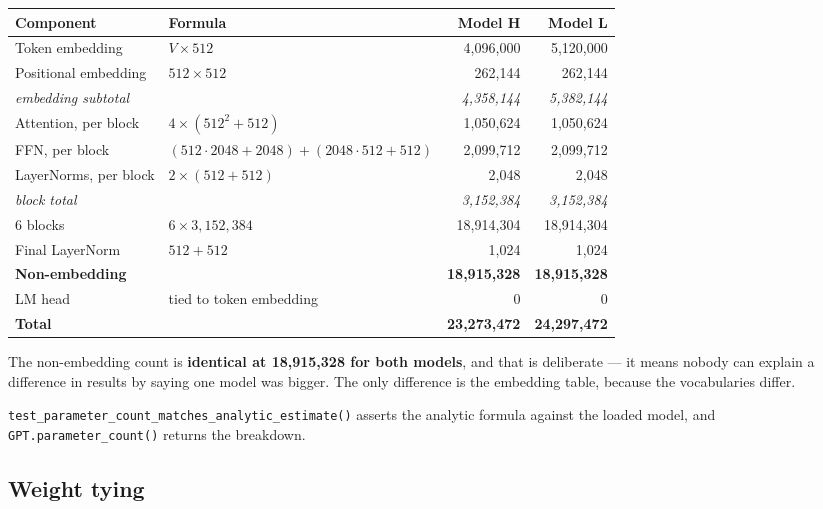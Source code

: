 \documentclass[11pt]{report}
\begin{document}
\begin{center}\small
\begin{tabular}{llrr}
\toprule
\textbf{Component} & \textbf{Formula} & \textbf{Model H} & \textbf{Model L} \\
\midrule
Token embedding & $V \times 512$ & 4,096,000 & 5,120,000 \\
Positional embedding & $512 \times 512$ & 262,144 & 262,144 \\
\textit{embedding subtotal} & & \textit{4,358,144} & \textit{5,382,144} \\
\midrule
Attention, per block & $4 \times (512^2 + 512)$ & 1,050,624 & 1,050,624 \\
FFN, per block & $(512{\cdot}2048{+}2048) + (2048{\cdot}512{+}512)$ & 2,099,712 & 2,099,712 \\
LayerNorms, per block & $2 \times (512 + 512)$ & 2,048 & 2,048 \\
\textit{block total} & & \textit{3,152,384} & \textit{3,152,384} \\
\midrule
6 blocks & $6 \times 3{,}152{,}384$ & 18,914,304 & 18,914,304 \\
Final LayerNorm & $512 + 512$ & 1,024 & 1,024 \\
\textbf{Non-embedding} & & \textbf{18,915,328} & \textbf{18,915,328} \\
\midrule
LM head & tied to token embedding & 0 & 0 \\
\textbf{Total} & & \textbf{23,273,472} & \textbf{24,297,472} \\
\bottomrule
\end{tabular}
\end{center}

\begin{keypoint}
The non-embedding count is \textbf{identical at 18,915,328 for both models},
and that is deliberate --- it means nobody can explain a difference in results
by saying one model was bigger. The only difference is the embedding table,
because the vocabularies differ.
\end{keypoint}

\begin{notebox}
\texttt{test\_parameter\_count\_matches\_analytic\_estimate()} asserts the
analytic formula against the loaded model, and \texttt{GPT.parameter\_count()}
returns the breakdown.
\end{notebox}

\subsection{Weight tying}
\end{document}
